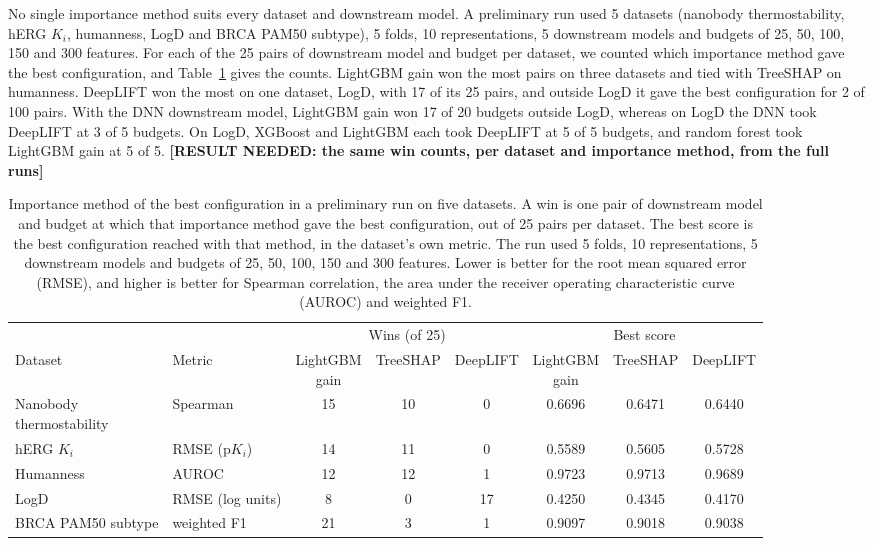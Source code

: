 No single importance method suits every dataset and downstream model. A preliminary run used 5 datasets (nanobody thermostability, hERG $K_i$, humanness, LogD and BRCA PAM50 subtype), 5 folds, 10 representations, 5 downstream models and budgets of 25, 50, 100, 150 and 300 features. For each of the 25 pairs of downstream model and budget per dataset, we counted which importance method gave the best configuration, and Table~\ref{tab:importance_wins} gives the counts. LightGBM gain won the most pairs on three datasets and tied with TreeSHAP on humanness. DeepLIFT won the most on one dataset, LogD, with 17 of its 25 pairs, and outside LogD it gave the best configuration for 2 of 100 pairs. With the DNN downstream model, LightGBM gain won 17 of 20 budgets outside LogD, whereas on LogD the DNN took DeepLIFT at 3 of 5 budgets. On LogD, XGBoost and LightGBM each took DeepLIFT at 5 of 5 budgets, and random forest took LightGBM gain at 5 of 5. \textbf{[RESULT NEEDED: the same win counts, per dataset and importance method, from the full runs]}

\begin{table}[htbp]
\centering
\small
\begin{adjustbox}{max width=\textwidth}
\begin{tabular}{@{}llcccccc@{}}
\toprule
 & & \multicolumn{3}{c}{Wins (of 25)} & \multicolumn{3}{c}{Best score} \\
\cmidrule(lr){3-5}\cmidrule(lr){6-8}
Dataset & Metric & \makecell{LightGBM\\gain} & TreeSHAP & DeepLIFT & \makecell{LightGBM\\gain} & TreeSHAP & DeepLIFT \\
\midrule
\makecell[l]{Nanobody\\thermostability} & Spearman & 15 & 10 & 0 & 0.6696 & 0.6471 & 0.6440 \\
hERG $K_i$ & RMSE (p$K_i$) & 14 & 11 & 0 & 0.5589 & 0.5605 & 0.5728 \\
Humanness & AUROC & 12 & 12 & 1 & 0.9723 & 0.9713 & 0.9689 \\
LogD & RMSE (log units) & 8 & 0 & 17 & 0.4250 & 0.4345 & 0.4170 \\
BRCA PAM50 subtype & weighted F1 & 21 & 3 & 1 & 0.9097 & 0.9018 & 0.9038 \\
\bottomrule
\end{tabular}
\end{adjustbox}
\caption[Importance method of the best configuration in a preliminary run.]{Importance method of the best configuration in a preliminary run on five datasets. A win is one pair of downstream model and budget at which that importance method gave the best configuration, out of 25 pairs per dataset. The best score is the best configuration reached with that method, in the dataset's own metric. The run used 5 folds, 10 representations, 5 downstream models and budgets of 25, 50, 100, 150 and 300 features. Lower is better for the root mean squared error (RMSE), and higher is better for Spearman correlation, the area under the receiver operating characteristic curve (AUROC) and weighted F1.}
\label{tab:importance_wins}
\end{table}


